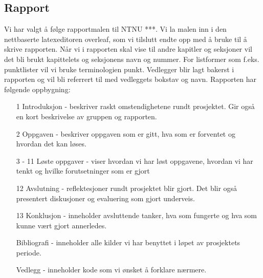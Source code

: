 \subsection{Rapport}
Vi har valgt å følge rapportmalen til NTNU ***. Vi la malen inn i den nettbaserte latexeditoren overleaf, som vi tilslutt endte opp med å bruke til å skrive rapporten. Når vi i rapporten skal vise til andre kapitler og seksjoner vil det bli brukt kapittelets og seksjonens navn og nummer. For listformer som f.eks. punktlister vil vi bruke terminologien punkt. Vedlegger blir lagt bakerst i rapporten og vil bli referrert til med vedleggets bokstav og navn. Rapporten har følgende oppbygning:
\begin{itemize}
  \item[1] Introduksjon - beskriver raskt omstendighetene rundt prosjektet. Gir også en kort beskrivelse av gruppen og rapporten.
  \item[2] Oppgaven - beskriver oppgaven som er gitt, hva som er forventet og hvordan det kan løses.
  \item[3 - 11] Løste oppgaver - viser hvordan vi har løst oppgavene, hvordan vi har tenkt og hvilke forutsetninger som er gjort
   \item[12] Avslutning - reflektesjoner rundt prosjektet blir gjort. Det blir også presentert diskusjoner og evaluering som gjort underveis.
  \item[13] Konklusjon - inneholder avsluttende tanker, hva som fungerte og hva som kunne vært gjort annerledes.
  \item[] Bibliografi - inneholder alle kilder vi har benyttet i løpet av prosjektets periode.
  \item[] Vedlegg - inneholder kode som vi ønsket å forklare nærmere.
\end{itemize}
